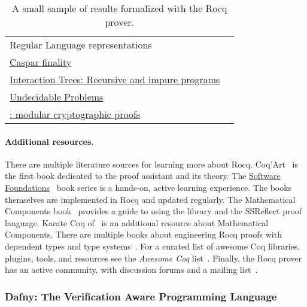 \begin{table}
\begin{NiceTabularX}{\textwidth}{@{}l@{ }X@{}}
   {Regular Language representations}
   & \textcite{doczkal2018}
\\
   \href{https://github.com/runtimeverification/casper-proofs/tree/master}
   {Caspar  finality}
   & \textcite{palmskog2018}
\\
   \href{https://github.com/DeepSpec/InteractionTrees}%
   {Interaction Trees: Recursive and impure programs}
   & \textcite{xia2019}
\\
   \href{https://github.com/uds-psl/coq-library-undecidability}%
   {Undecidable Problems}
   & \textcite{forster2020b}
\\
   \href{https://github.com/SSProve/ssprove}%
   {: modular cryptographic proofs}
   & \textcite{haselwarter2023}
\\
\bottomrule
\end{NiceTabularX}
\caption[The Rocq prover formalization results]
{A small sample of results formalized with the Rocq prover.}
\label{tab:rocq-results}
\end{table}

\paragraph*{Additional resources.}
There are multiple literature sources for learning more about Rocq.
Coq'Art~\cite{bertot2004} is the first book dedicated to the proof assistant and its theory.
The \href{https://softwarefoundations.cis.upenn.edu}{Software Foundations}~\cite{cpierce20221}
book series is a hands-on, active learning experience.
The books themselves are implemented in Rocq and updated regularly.
The Mathematical Components book~\cite{mahboubi2022} provides a guide to using the library and the SSReflect proof language.
Karate Coq of~\textcite{affeldt2023} is an additional resource about Mathematical Components.
There are multiple books about engineering Rocq proofs with dependent types and type systems~\cite{chlipala2022,chlipala2013,sergey2014,smolka2021}.
For a curated list of awesome Coq libraries, plugins, tools, and resources see the
\emph{Awesome Coq} list~\cite{awesome-coq}.
Finally, the Rocq prover has an active community, with discussion forums and a mailing list~\cite{rocq-community}.

\subsubsection{Dafny: The Verification Aware Programming Language}
\label{subsec:dafny}

